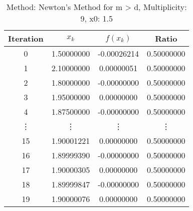 \begin{table}
\centering
\caption{Method: Newton's Method for m > d, Multiplicity: 9, x0: 1.5}
\label{tab:table_Newton's_Method_for_m_>_d_9_1_5}
\begin{tabular}{c c c c}
\toprule
Iteration &      $x_k$ &    $f(x_k)$ &      Ratio \\
\midrule
        0 & 1.50000000 & -0.00026214 & 0.50000000 \\
        1 & 2.10000000 &  0.00000051 & 0.50000000 \\
        2 & 1.80000000 & -0.00000000 & 0.50000000 \\
        3 & 1.95000000 &  0.00000000 & 0.50000000 \\
        4 & 1.87500000 & -0.00000000 & 0.50000000 \\
   \vdots &     \vdots &      \vdots &     \vdots \\
       15 & 1.90001221 &  0.00000000 & 0.50000000 \\
       16 & 1.89999390 & -0.00000000 & 0.50000000 \\
       17 & 1.90000305 &  0.00000000 & 0.50000000 \\
       18 & 1.89999847 & -0.00000000 & 0.50000000 \\
       19 & 1.90000076 &  0.00000000 & 0.50000000 \\
\bottomrule
\end{tabular}
\end{table}
